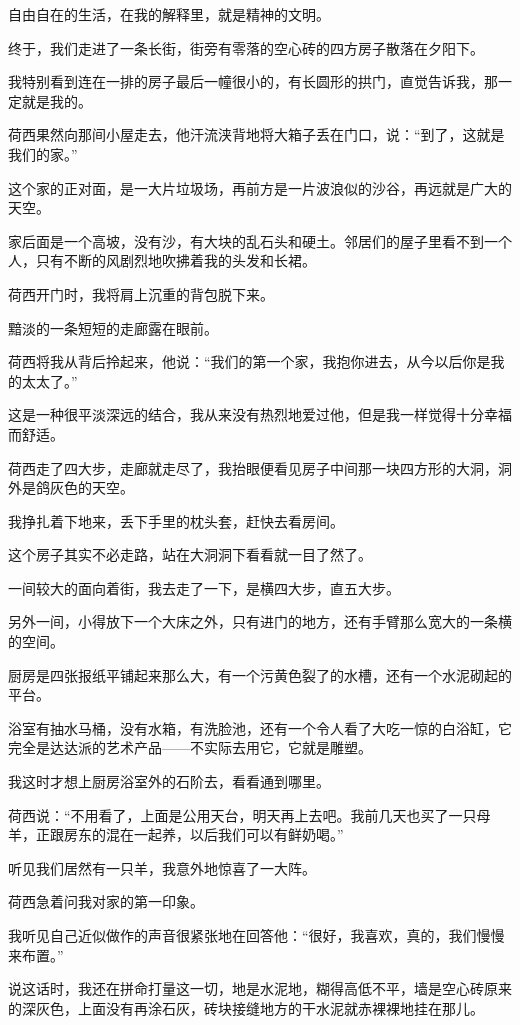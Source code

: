 \par 自由自在的生活，在我的解释里，就是精神的文明。
\par 终于，我们走进了一条长街，街旁有零落的空心砖的四方房子散落在夕阳下。
\par 我特别看到连在一排的房子最后一幢很小的，有长圆形的拱门，直觉告诉我，那一定就是我的。
\par 荷西果然向那间小屋走去，他汗流浃背地将大箱子丢在门口，说：“到了，这就是我们的家。”
\par 这个家的正对面，是一大片垃圾场，再前方是一片波浪似的沙谷，再远就是广大的天空。
\par 家后面是一个高坡，没有沙，有大块的乱石头和硬土。邻居们的屋子里看不到一个人，只有不断的风剧烈地吹拂着我的头发和长裙。
\par 荷西开门时，我将肩上沉重的背包脱下来。
\par 黯淡的一条短短的走廊露在眼前。
\par 荷西将我从背后拎起来，他说：“我们的第一个家，我抱你进去，从今以后你是我的太太了。”
\par 这是一种很平淡深远的结合，我从来没有热烈地爱过他，但是我一样觉得十分幸福而舒适。
\par 荷西走了四大步，走廊就走尽了，我抬眼便看见房子中间那一块四方形的大洞，洞外是鸽灰色的天空。
\par 我挣扎着下地来，丢下手里的枕头套，赶快去看房间。
\par 这个房子其实不必走路，站在大洞洞下看看就一目了然了。
\par 一间较大的面向着街，我去走了一下，是横四大步，直五大步。
\par 另外一间，小得放下一个大床之外，只有进门的地方，还有手臂那么宽大的一条横的空间。
\par 厨房是四张报纸平铺起来那么大，有一个污黄色裂了的水槽，还有一个水泥砌起的平台。
\par 浴室有抽水马桶，没有水箱，有洗脸池，还有一个令人看了大吃一惊的白浴缸，它完全是达达派的艺术产品——不实际去用它，它就是雕塑。
\par 我这时才想上厨房浴室外的石阶去，看看通到哪里。
\par 荷西说：“不用看了，上面是公用天台，明天再上去吧。我前几天也买了一只母羊，正跟房东的混在一起养，以后我们可以有鲜奶喝。”
\par 听见我们居然有一只羊，我意外地惊喜了一大阵。
\par 荷西急着问我对家的第一印象。
\par 我听见自己近似做作的声音很紧张地在回答他：“很好，我喜欢，真的，我们慢慢来布置。”
\par 说这话时，我还在拼命打量这一切，地是水泥地，糊得高低不平，墙是空心砖原来的深灰色，上面没有再涂石灰，砖块接缝地方的干水泥就赤裸裸地挂在那儿。
